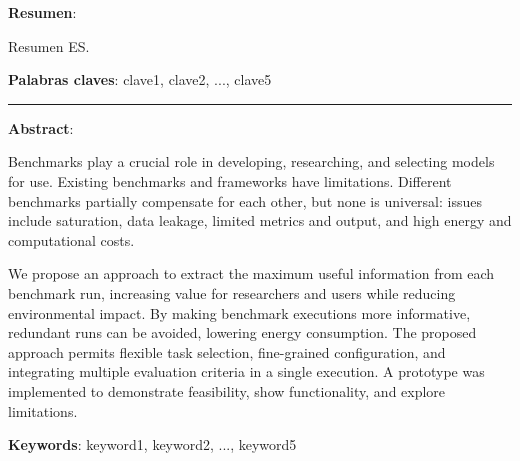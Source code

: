 \textbf{Resumen}:

Resumen ES.

\textbf{Palabras claves}: clave1, clave2, ..., clave5

\vspace{1cm}
\begin{center}
  \rule{0.5\textwidth}{.4pt}
\end{center}
\vspace{1cm}

\textbf{Abstract}:

Benchmarks play a crucial role in developing, researching, and selecting models for use. Existing benchmarks and frameworks have limitations. Different benchmarks partially compensate for each other, but none is universal: issues include saturation, data leakage, limited metrics and output, and high energy and computational costs.

We propose an approach to extract the maximum useful information from each benchmark run, increasing value for researchers and users while reducing environmental impact. By making benchmark executions more informative, redundant runs can be avoided, lowering energy consumption. The proposed approach permits flexible task selection, fine-grained configuration, and integrating multiple evaluation criteria in a single execution. A prototype was implemented to demonstrate feasibility, show functionality, and explore limitations.

\textbf{Keywords}: keyword1, keyword2, ..., keyword5
